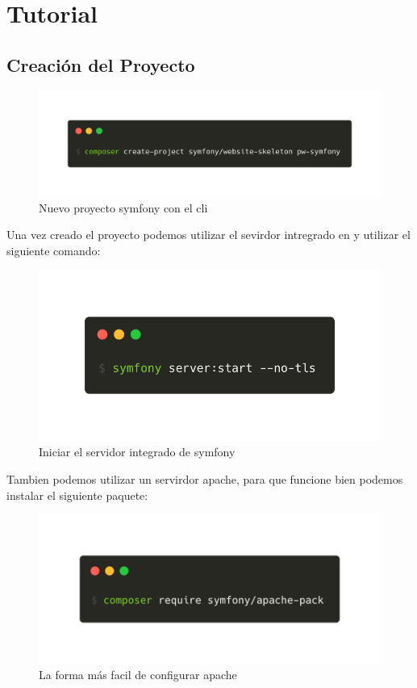\section{Tutorial}
\subsection{Creación del Proyecto}
\begin{figure}[ht]
  \centering
  \includegraphics[width=\textwidth]{../assets/composer_create_project.png}
  \caption{Nuevo proyecto symfony con el cli}
  \label{fig:composer_create_project}
\end{figure}

Una vez creado el proyecto podemos utilizar el sevirdor intregrado en y utilizar el siguiente comando:

\begin{figure}[ht]
  \centering
  \includegraphics[width=\textwidth]{../assets/symfony_server_start.png}
  \caption{Iniciar el servidor integrado de symfony}
  \label{fig:symfony_server_start}
\end{figure}

\clearpage
Tambien podemos utilizar un servirdor apache, para que funcione bien podemos instalar el siguiente paquete:

\begin{figure}[ht]
  \centering
  \includegraphics[width=\textwidth]{../assets/composer_apache.png}
  \caption{La forma más facil de configurar apache}
  \label{fig:composer_apache}
\end{figure}

